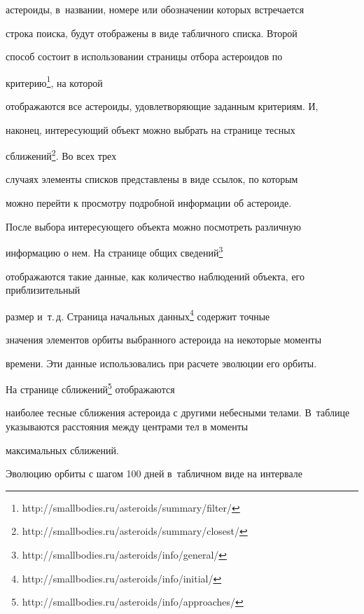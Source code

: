 астероиды, в~названии, номере или обозначении которых встречается


строка поиска, будут отображены в виде табличного списка. Второй


способ состоит в использовании страницы отбора астероидов по


критерию\footnote{\tt


http://smallbodies.ru/asteroids/summary/filter/}\!\!, на которой


отображаются все астероиды, удовлетворяющие заданным критериям. И,


наконец, интересующий объект можно выбрать на странице тесных


сближений\footnote{\tt


http://smallbodies.ru/asteroids/summary/closest/}\!\!. Во всех трех


случаях элементы списков представлены в виде ссылок, по которым


можно перейти к просмотру подробной информации об астероиде.





После выбора интересующего объекта можно посмотреть различную


информацию о нем. На странице общих сведений\footnote{\tt


http://smallbodies.ru/asteroids/info/general/}\!\! 


отображаются такие данные, как количество наблюдений объекта, его приблизительный


размер и~т.\,д. Страница начальных данных\footnote{\tt


http://smallbodies.ru/asteroids/info/initial/}\!\! содержит точные


значения элементов орбиты выбранного астероида на некоторые моменты


времени. Эти данные использовались при расчете эволюции его орбиты.


На странице сближений\footnote{\tt


http://smallbodies.ru/asteroids/info/approaches/}\!\! отображаются


наиболее тесные сближения астероида с другими небесными телами. В~таблице указываются расстояния между центрами тел в моменты


максимальных сближений.





Эволюцию орбиты с шагом 100 дней в~табличном виде  на интервале


